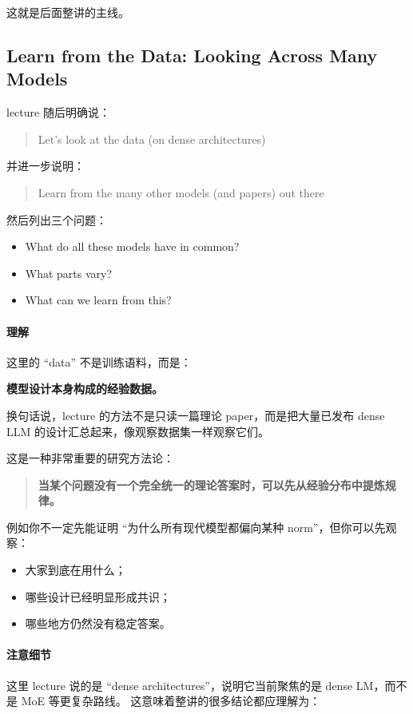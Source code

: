 \documentclass[a4paper,UTF8]{article}
\numberwithin{equation}{section}
\begin{document}
这就是后面整讲的主线。

\subsection{Learn from the Data: Looking Across Many Models}

lecture 随后明确说：
\begin{quote}
Let’s look at the data (on dense architectures)
\end{quote}

并进一步说明：
\begin{quote}
Learn from the many other models (and papers) out there
\end{quote}

然后列出三个问题：
\begin{itemize}
    \item What do all these models have in common?
    \item What parts vary?
    \item What can we learn from this?
\end{itemize}

\paragraph{理解}
这里的 ``data'' 不是训练语料，而是：
\begin{center}
\textbf{模型设计本身构成的经验数据。}
\end{center}

换句话说，lecture 的方法不是只读一篇理论 paper，而是把大量已发布 dense LLM 的设计汇总起来，像观察数据集一样观察它们。

这是一种非常重要的研究方法论：

\begin{quote}
\textbf{当某个问题没有一个完全统一的理论答案时，可以先从经验分布中提炼规律。}
\end{quote}

例如你不一定先能证明 ``为什么所有现代模型都偏向某种 norm''，但你可以先观察：
\begin{itemize}
    \item 大家到底在用什么；
    \item 哪些设计已经明显形成共识；
    \item 哪些地方仍然没有稳定答案。
\end{itemize}

\paragraph{注意细节}
这里 lecture 说的是 ``dense architectures''，说明它当前聚焦的是 dense LM，而不是 MoE 等更复杂路线。  
这意味着整讲的很多结论都应理解为：
\end{document}

